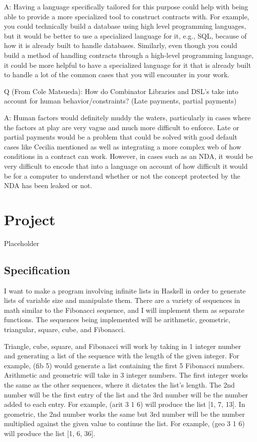 \documentclass{article}
\theoremstyle{theorem}
\theoremstyle{definition}
\theoremstyle{remark}
\begin{document}
\medskip\noindent
A: Having a language specifically tailored for this purpose could help with being able to provide a more specialized tool to construct contracts with. For example, you could technically build a database using high level programming languages, but it would be better to use a specialized language for it, e.g., SQL, because of how it is already built to handle databases. Similarly, even though you could build a method of handling contracts through a high-level programming language, it could be more helpful to have a specialized language for it that is already built to handle a lot of the common cases that you will encounter in your work.

\medskip\noindent
Q (From Cole Matsueda): How do Combinator Libraries and DSL's take into account for human behavior/constraints? (Late payments,  partial payments)

\medskip\noindent
A: Human factors would definitely muddy the waters, particularly in cases where the factors at play are very vague and much more difficult to enforce. Late or partial payments would be a problem that could be solved with good default cases like Cecilia mentioned as well as integrating a more complex web of how conditions in a contract can work. However, in cases such as an NDA, it would be very difficult to encode that into a language on account of how difficult it would be for a computer to understand whether or not the concept protected by the NDA has been leaked or not.

\section{Project}

Placeholder

\subsection{Specification}
I want to make a program involving infinite lists in Haskell in order to generate lists of variable size and manipulate them. There are a variety of sequences in math similar to the Fibonacci sequence, and I will implement them as separate functions. The sequences being implemented will be arithmetic, geometric, triangular, square, cube, and Fibonacci.

\medskip\noindent
Triangle, cube, square, and Fibonacci will work by taking in 1 integer number and generating a list of the sequence with the length of the given integer. For example, (fib 5) would generate a list containing the first 5 Fibonacci numbers. Arithmetic and geometric will take in 3 integer numbers. The first integer works the same as the other sequences, where it dictates the list's length. The 2nd number will be the first entry of the list and the 3rd number will be the number added to each entry. For example, (arit 3 1 6) will produce the list [1, 7, 13]. In geometric, the 2nd number works the same but 3rd number will be the number multiplied against the given value to continue the list. For example, (geo 3 1 6) will produce the list [1, 6, 36].
\end{document}
